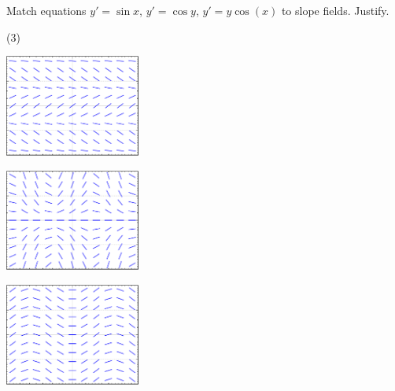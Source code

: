 \begin{exercise}\ansMark%
Match equations $y'=\sin x$, $y'=\cos y$, $y' = y\cos(x)$ to slope fields.
Justify.
\begin{tasks}(3)
\task
\parbox[c]{1.75in}{\includegraphics[width=1.75in]{figures/yprimecosyslope}}
\task
\parbox[c]{1.75in}{\includegraphics[width=1.75in]{figures/yprimecosxyslope}}
\task
\parbox[c]{1.75in}{\includegraphics[width=1.75in]{figures/yprimesinxslope}}
\end{tasks}
\end{exercise}

